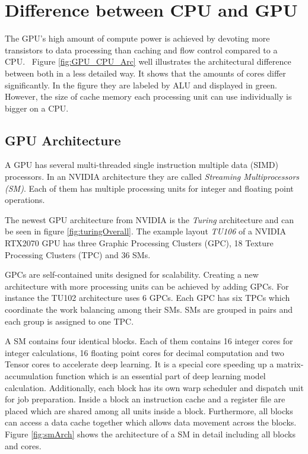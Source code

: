 \section{Difference between CPU and GPU} 
  The GPU's high amount of compute power is achieved by devoting more transistors to data processing than caching and flow control compared to a CPU.~\cite{NVIDIA.2019}
  Figure \ref{fig:GPU_CPU_Arc} well illustrates the architectural difference between both in a less detailed way.
  It shows that the amounts of cores differ significantly.
  In the figure they are labeled by ALU and displayed in green.
  However, the size of cache memory each processing unit can use individually is bigger on a CPU.
  
  
\subsection{GPU Architecture}
\label{subsec:GPU_Arc}
  A GPU has several multi-threaded single instruction multiple data (SIMD) processors.
  In an NVIDIA architecture they are called \textit{Streaming Multiprocessors (SM)}.
  Each of them has multiple processing units for integer and floating point operations. ~\cite{Rauber.2012}

  The newest GPU architecture from NVIDIA is the \textit{Turing} architecture and can be seen in figure \ref{fig:turingOverall}.
  The example layout \textit{TU106} of a NVIDIA RTX2070 GPU has three Graphic Processing Clusters (GPC), 18 Texture Processing Clusters (TPC) and 36 SMs.~\cite{NVIDIA.2018}
  	  
  GPCs are self-contained units designed for scalability.
  Creating a new architecture with more processing units can be achieved by adding GPCs.
  For instance the TU102 architecture uses 6 GPCs.
  Each GPC has six TPCs which coordinate the work balancing among their SMs.
  SMs are grouped in pairs and each group is assigned to one TPC.~\cite{Lindholm.2008}~\cite{NVIDIA.2018}
    
  A SM contains four identical blocks.
  Each of them contains 16 integer cores for integer calculations, 16 floating point cores for decimal computation and two Tensor cores to accelerate deep learning.
  It is a special core speeding up a matrix-accumulation function which is an essential part of deep learning model calculation.
  Additionally, each block has its own warp scheduler and dispatch unit for job preparation.
  Inside a block an instruction cache and a register file are placed which are shared among all units inside a block.
  Furthermore, all blocks can access a data cache together which allows data movement across the blocks.
  Figure \ref{fig:smArch} shows the architecture of a SM in detail including all blocks and cores.~\cite{Burgess.2020}~\cite{NVIDIA.2018}

